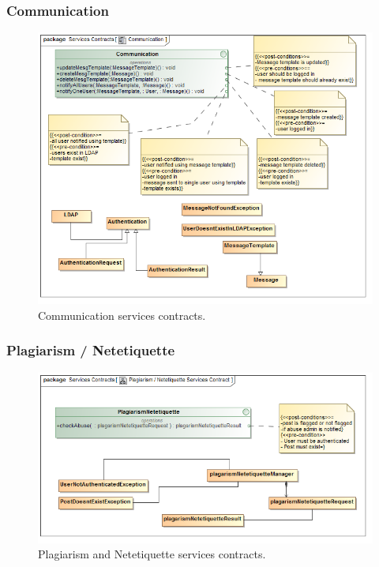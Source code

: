 \documentclass [a4paper,12pt] {article}
\begin{document}
		\subsubsection{Communication}
			\begin{figure}[H]
				\centering
				\includegraphics[width=1.0\textwidth]{CommunicationSC.png}
				\caption{Communication services contracts.}
			\end{figure}
		
		\subsubsection{Plagiarism / Netetiquette}
			\begin{figure}[H]
				\centering
				\includegraphics[width=1.0\textwidth]{PlagiarismNetetiquetteSC.png}
				\caption{Plagiarism and Netetiquette services contracts.}
			\end{figure}
\end{document}

